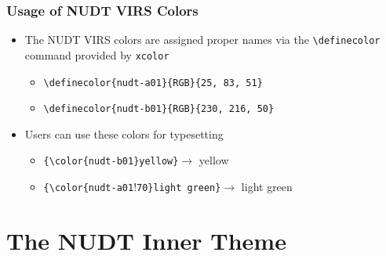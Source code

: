 \documentclass{beamer}
\begin{document}
\begin{frame}[fragile]
  \frametitle{Usage of NUDT VIRS Colors}
  \begin{itemize}
  \item The NUDT VIRS colors are assigned proper names via
    the \texttt{\textbackslash{}definecolor} command provided
    by \texttt{xcolor}
    \begin{itemize}
    \item \verb!\definecolor{nudt-a01}{RGB}{25, 83, 51}!
    \item \verb!\definecolor{nudt-b01}{RGB}{230, 216, 50}!
    \end{itemize}
  \item Users can use these colors for typesetting
    \begin{itemize}
      \item \verb!{\color{nudt-b01}yellow}!$\rightarrow$ {\color{nudt-b01}yellow}
      \item \verb!{\color{nudt-a01!!\verb!70}light green}!$\rightarrow$ {\color{nudt-a01!70}light green}
    \end{itemize}
  \end{itemize}
\end{frame}

\section[Inner]{The NUDT Inner Theme}
\end{document}
